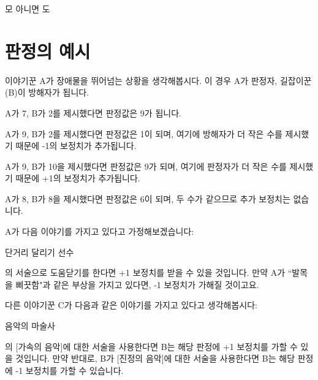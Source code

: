 \documentclass{report}
\begin{document}
	\begin{lite}{모 아니면 도}
		
		
		
	\end{lite}
	\fi
	
	\section*{판정의 예시}
	이야기꾼 A가 장애물을 뛰어넘는 상황을 생각해봅시다. 이 경우 A가 판정자, 길잡이꾼(B)이 방해자가 됩니다.
	
	A가 7, B가 2를 제시했다면 판정값은 9가 됩니다.
	
	A가 9, B가 2를 제시했다면 판정값은 1이 되며, 여기에 방해자가 더 작은 수를 제시했기 때문에 -1의 보정치가 추가됩니다.
	
	A가 9, B가 10을 제시했다면 판정값은 9가 되며, 여기에 판정자가 더 작은 수를 제시했기 때문에 +1의 보정치가 추가됩니다.
	
	A가 8, B가 8을 제시했다면 판정값은 6이 되며, 두 수가 같으므로 추가 보정치는 없습니다.
	
	A가 다음 이야기를 가지고 있다고 가정해보겠습니다:
	\begin{lite}[runner]{단거리 달리기 선수}
	\end{lite}
	
	의 서술으로 도움닫기를 한다면 +1 보정치를 받을 수 있을 것입니다. 만약 A가 ``발목을 삐끗함"과 같은 부상을 가지고 있다면, -1 보정치가 가해질 것이고요.
	
	다른 이야기꾼 C가 다음과 같은 이야기를 가지고 있다고 생각해봅시다:
	\begin{lite}{음악의 마술사}
		
	\end{lite}
	
	의 [가속의 음악]에 대한 서술을 사용한다면 B는 해당 판정에 +1 보정치를 가할 수 있을 것입니다. 만약 반대로, B가 [진정의 음악]에 대한 서술을 사용한다면 B는 해당 판정에 -1 보정치를 가할 수 있습니다.
	
\end{document}
